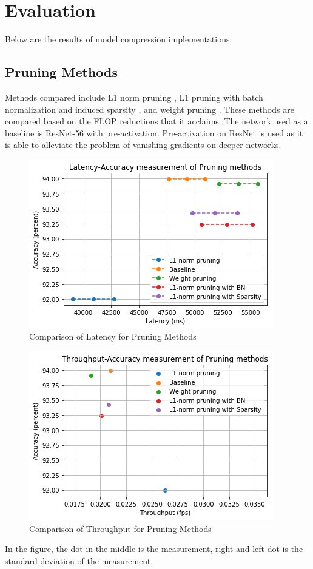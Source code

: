 

    \chapter{Evaluation}
	Below are the results of model compression implementations.
	
	\section{Pruning Methods}
	Methods compared include L1 norm pruning \cite{Li2016PruningFF}, L1 pruning with batch normalization and induced sparsity \cite{Liu_2017_ICCV}, and weight pruning \cite{Han2015DeepCC}. These methods are compared based on the FLOP reductions that it acclaims.
	The network used as a baseline is ResNet-56 with pre-activation. Pre-activation on ResNet is used as it is able to alleviate the problem of vanishing gradients on deeper networks. \cite{10.1007/978-3-319-46493-0_38} 
	\begin{figure}
		\centering
		\includegraphics[width=0.7\linewidth]{pruning_result_2}
		\caption{Comparison of Latency for Pruning Methods}
		\label{fig:pruning_result_2}
	\end{figure}
	
	\begin{figure}
		\centering
		\includegraphics[width=0.7\linewidth]{throughput_2}
		\caption{Comparison of Throughput for Pruning Methods}
		\label{fig:throughput_2}
	\end{figure}
	
	In the figure, the dot in the middle is the measurement, right and left dot is the standard deviation of the measurement.

